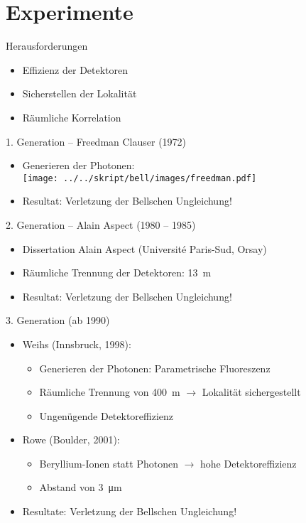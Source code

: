 \documentclass{beamer}
\begin{document}
\section{Experimente}
\begin{frame}{Herausforderungen}
    \begin{itemize}
        \item Effizienz der Detektoren
        \item Sicherstellen der Lokalit\"at
        \item R\"aumliche Korrelation
    \end{itemize}
\end{frame}
\begin{frame}{1. Generation -- Freedman Clauser (1972)}
    \begin{itemize}
        \item Generieren der Photonen: \\
            {
                \centering
                \texttt{[image: ../../skript/bell/images/freedman.pdf]}
            }
        \item Resultat: Verletzung der Bellschen Ungleichung!
    \end{itemize}

\end{frame}
\begin{frame}{2. Generation -- Alain Aspect (1980 -- 1985)}
    \begin{itemize}
        \item Dissertation Alain Aspect (Universit\'e Paris-Sud, Orsay)
        \item R\"aumliche Trennung der Detektoren: \SI{13}{\meter}
        \item Resultat: Verletzung der Bellschen Ungleichung!
    \end{itemize}
\end{frame}
\begin{frame}{3. Generation (ab 1990)}
    \begin{itemize}[<+->]
        \item Weihs (Innsbruck, 1998):
            \begin{itemize}[<.->]
                \item Generieren der Photonen: Parametrische Fluoreszenz
                \item R\"aumliche Trennung von \SI{400}{\meter} $\to$ Lokalit\"at sichergestellt
                \item Ungen\"ugende Detektoreffizienz
            \end{itemize}
        \item Rowe (Boulder, 2001):
            \begin{itemize}[<.->]
                \item Beryllium-Ionen statt Photonen $\to$ hohe Detektoreffizienz
                \item Abstand von \SI{3}{\micro\meter}
            \end{itemize}
            \item Resultate: Verletzung der Bellschen Ungleichung!
    \end{itemize}
\end{frame}
\end{document}
